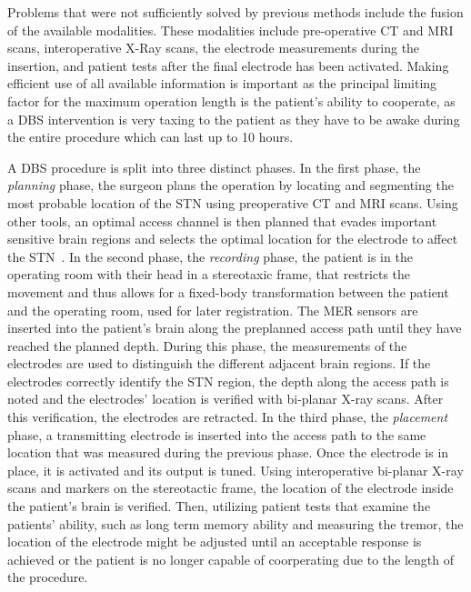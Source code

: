 Problems that were not sufficiently solved by previous methods include the fusion of the available modalities. These modalities include pre-operative CT and MRI scans, interoperative X-Ray scans, the electrode measurements during the insertion, and patient tests after the final electrode has been activated. Making efficient use of all available information is important as the principal limiting factor for the maximum operation length is the patient's ability to cooperate, as a DBS intervention is very taxing to the patient as they have to be awake during the entire procedure which can last up to 10 hours.

A DBS procedure is split into three distinct phases. In the first phase, the \emph{planning} phase, the surgeon plans the operation by locating and segmenting the most probable location of the STN using preoperative CT and MRI scans. Using other tools, an optimal access channel is then planned that evades important sensitive brain regions and selects the optimal location for the electrode to affect the STN~\cite{butson2007patient}. In the second phase, the \emph{recording} phase, the patient is in the operating room with their head in a stereotaxic frame, that restricts the movement and thus allows for a fixed-body transformation between the patient and the operating room, used for later registration. The MER sensors are inserted into the patient's brain along the preplanned access path until they have reached the planned depth. During this phase, the measurements of the electrodes are used to distinguish the different adjacent brain regions. If the electrodes correctly identify the STN region, the depth along the access path is noted and the electrodes' location is verified with bi-planar X-ray scans. After this verification, the electrodes are retracted. In the third phase, the \emph{placement} phase, a transmitting electrode is inserted into the access path to the same location that was measured during the previous phase. Once the electrode is in place, it is activated and its output is tuned. Using interoperative bi-planar X-ray scans and markers on the stereotactic frame, the location of the electrode inside the patient's brain is verified. Then, utilizing patient tests that examine the patients' ability, such as long term memory ability and measuring the tremor, the location of the electrode might be adjusted until an acceptable response is achieved or the patient is no longer capable of coorperating due to the length of the procedure.


